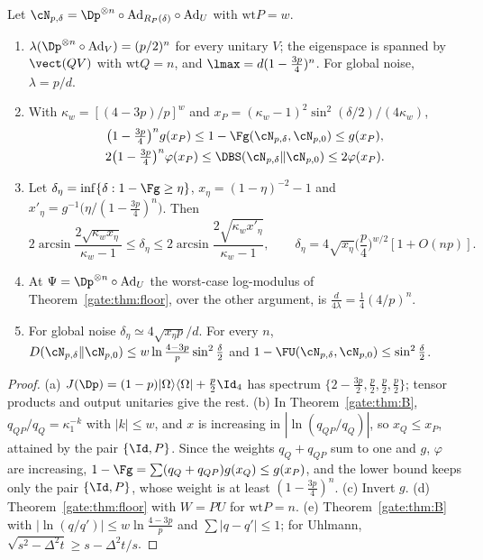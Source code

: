 \begin{theorem}\label{gate:thm:W}
Let $\cN_{p,\delta}=\Dp^{\otimes n}\circ\mathrm{Ad}_{R_P(\delta)}\circ\mathrm{Ad}_U$ with $\mathrm{wt}P=w$.
\begin{enumerate}
\item[(a)] $\lambda(\Dp^{\otimes n}\circ\mathrm{Ad}_V)=(p/2)^n$ for every unitary $V$; the eigenspace is spanned by $\vect(QV)$ with $\mathrm{wt}Q=n$, and $\lmax=d(1-\frac{3p}4)^n$. For global noise, $\lambda=p/d$.
\item[(b)] With $\kappa_w=[(4-3p)/p]^w$ and $x_P=(\kappa_w-1)^2\sin^2(\delta/2)/(4\kappa_w)$,
\begin{equation}
\begin{gathered}
\big(1-\tfrac{3p}4\big)^ng(x_P)\le1-\Fg(\cN_{p,\delta},\cN_{p,0})\le g(x_P),\\
2\big(1-\tfrac{3p}4\big)^n\varphi(x_P)\le\DBS(\cN_{p,\delta}\|\cN_{p,0})\le2\varphi(x_P).
\end{gathered}
\end{equation}
\item[(c)] Let $\delta_\eta=\inf\{\delta:1-\Fg\ge\eta\}$, $x_\eta=(1-\eta)^{-2}-1$ and $x'_\eta=g^{-1}\big(\eta/(1-\frac{3p}4)^n\big)$. Then
\begin{equation}
2\arcsin\frac{2\sqrt{\kappa_wx_\eta}}{\kappa_w-1}\le\delta_\eta\le2\arcsin\frac{2\sqrt{\kappa_wx'_\eta}}{\kappa_w-1},\qquad\delta_\eta=4\sqrt{x_\eta}\Big(\frac p4\Big)^{w/2}[1+O(np)].
\end{equation}
\item[(d)] At $\Psi=\Dp^{\otimes n}\circ\mathrm{Ad}_U$ the worst-case log-modulus of Theorem~\ref{gate:thm:floor}, over the other argument, is $\frac{d}{4\lambda}=\frac14(4/p)^n$.
\item[(e)] For global noise $\delta_\eta\simeq4\sqrt{x_\eta p}/d$. For every $n$, $D(\cN_{p,\delta}\|\cN_{p,0})\le w\ln\frac{4-3p}{p}\sin^2\frac\delta2$ and $1-\FU(\cN_{p,\delta},\cN_{p,0})\le\sin^2\frac\delta2$.
\end{enumerate}
\end{theorem}

\begin{proof}
(a) $J(\Dp)=(1-p)|\Omega\rangle\langle\Omega|+\frac p2\Id_4$ has spectrum $\{2-\frac{3p}2,\frac p2,\frac p2,\frac p2\}$; tensor products and output unitaries give the rest. (b) In Theorem~\ref{gate:thm:B}, $q_{QP}/q_Q=\kappa_1^{-k}$ with $|k|\le w$, and $x$ is increasing in $|\ln(q_{QP}/q_Q)|$, so $x_Q\le x_P$, attained by the pair $\{\Id,P\}$. Since the weights $q_Q+q_{QP}$ sum to one and $g$, $\varphi$ are increasing, $1-\Fg=\sum(q_Q+q_{QP})g(x_Q)\le g(x_P)$, and the lower bound keeps only the pair $\{\Id,P\}$, whose weight is at least $(1-\frac{3p}4)^n$. (c) Invert $g$. (d) Theorem~\ref{gate:thm:floor} with $W=PU$ for $\mathrm{wt}P=n$. (e) Theorem~\ref{gate:thm:B} with $|\ln(q/q')|\le w\ln\frac{4-3p}p$ and $\sum|q-q'|\le1$; for Uhlmann, $\sqrt{s^2-\Delta^2t}\ge s-\Delta^2t/s$.
\end{proof}

